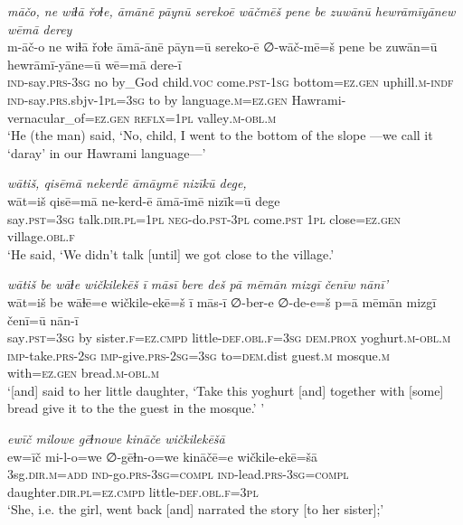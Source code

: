 \ea \label{ŽH.23}
\textit{māčo, ne wiɫā řoɫe, āmānē pāynū serekoē wāčmēš pene be zuwānū hewrāmīyānew wēmā derey} \\ 
\gll m-āč-o ne wiɫā řoɫe āmā-ānē pāyn=ū sereko-ē ∅-wāč-mē=š pene be zuwān=ū hewrāmī-yāne=ū wē=mā dere-ī \\ 
 \textsc{ind-}say\textsc{.prs}\textsc{-3sg} no by\_God child.\textsc{voc} come\textsc{.pst}\textsc{-1sg} bottom\textsc{=ez}\textsc{.gen} uphill\textsc{.m}\textsc{-indf} \textsc{ind-}say\textsc{.prs}.sbjv\textsc{-1pl}\textsc{=3sg} to by language\textsc{.m}\textsc{=ez}\textsc{.gen} Hawrami-vernacular\_of\textsc{=ez}\textsc{.gen} \textsc{reflx}\textsc{=1pl} valley\textsc{.m}\textsc{-obl}\textsc{.m} \\ 
\glt `He (the man) said, ‘No, child, I went to the bottom of the slope —we call it ‘daray’ in our Hawrami language—'
\z 
 
\ea \label{ŽH.30}
\textit{wātiš, qisēmā nekerdē āmāymē nizīkū dege,} \\ 
\gll wāt=iš qisē=mā ne-kerd-ē āmā-īmē nizīk=ū dege \\ 
 say\textsc{.pst}\textsc{=3sg} talk\textsc{.dir}\textsc{.pl}\textsc{=1pl} \textsc{neg-}do\textsc{.pst}\textsc{-3pl} come\textsc{.pst} \textsc{1pl} close\textsc{=ez}\textsc{.gen} village\textsc{.obl}\textsc{\textsc{.f}} \\ 
\glt `He said, ‘We didn’t talk [until] we got close to the village.'
\z 
 
\ea \label{ŽH.40}
\textit{wātiš be wāɫe wičkilekēš ī māsī bere deš pā mēmān mizgī čenīw nānī’} \\ 
\gll wāt=iš be wāɫē=e wičkile-ekē=š ī mās-ī ∅-ber-e ∅-de-e=š p=ā mēmān mizgī čenī=ū nān-ī \\ 
 say\textsc{.pst}\textsc{=3sg} by sister\textsc{\textsc{.f}}\textsc{=ez}\textsc{.cmpd} little\textsc{-def}\textsc{.obl}\textsc{\textsc{.f}}\textsc{=3sg} \textsc{dem.prox} yoghurt\textsc{.m}\textsc{-obl}\textsc{.m} \textsc{imp-}take\textsc{.prs}-\textsc{2sg} \textsc{imp-}give\textsc{.prs}-\textsc{2sg}\textsc{=3sg} to\textsc{=dem}.dist guest\textsc{.m} mosque\textsc{.m} with\textsc{=ez}\textsc{.gen} bread\textsc{.m}\textsc{-obl}\textsc{.m} \\ 
\glt `[and] said to her little daughter, ‘Take this yoghurt [and] together with [some] bread give it to the the guest in the mosque.’ '
\z 
 
\ea \label{ŽH.46}
\textit{ewīč milowe gēɫnowe kināče wičkilekēšā} \\ 
\gll ew=īč mi-l-o=we ∅-gēɫn-o=we kināčē=e wičkile-ekē=šā \\ 
 3sg\textsc{.dir}\textsc{.m}\textsc{=add} \textsc{ind-}go\textsc{.prs}\textsc{-3sg}\textsc{=compl} \textsc{ind-}lead\textsc{.prs}\textsc{-3sg}\textsc{=compl} daughter\textsc{.dir}\textsc{.pl}\textsc{=ez}\textsc{.cmpd} little\textsc{-def}\textsc{.obl}\textsc{\textsc{.f}}\textsc{=3pl} \\ 
\glt `She, i.e. the girl, went back [and] narrated the story [to her sister];'
\z 
 

